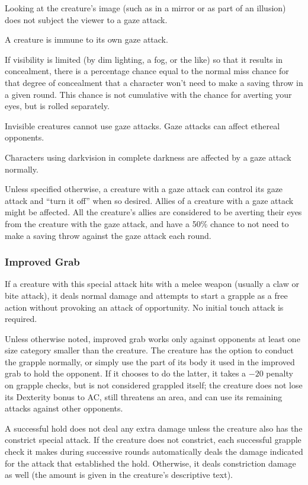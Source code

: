 Looking at the creature's image (such as in a mirror or as part of an illusion) does not subject the viewer to a gaze attack.

A creature is immune to its own gaze attack.

If visibility is limited (by dim lighting, a fog, or the like) so that it results in concealment, there is a percentage chance equal to the normal miss chance for that degree of concealment that a character won't need to make a saving throw in a given round. This chance is not cumulative with the chance for averting your eyes, but is rolled separately.

Invisible creatures cannot use gaze attacks. Gaze attacks can affect ethereal opponents.

Characters using darkvision in complete darkness are affected by a gaze attack normally.

Unless specified otherwise, a creature with a gaze attack can control its gaze attack and ``turn it off'' when so desired. Allies of a creature with a gaze attack might be affected. All the creature's allies are considered to be averting their eyes from the creature with the gaze attack, and have a 50\% chance to not need to make a saving throw against the gaze attack each round.

\subsubsection{Improved Grab}
If a creature with this special attack hits with a melee weapon (usually a claw or bite attack), it deals normal damage and attempts to start a grapple as a free action without provoking an attack of opportunity. No initial touch attack is required.

Unless otherwise noted, improved grab works only against opponents at least one size category smaller than the creature. The creature has the option to conduct the grapple normally, or simply use the part of its body it used in the improved grab to hold the opponent. If it chooses to do the latter, it takes a $-20$ penalty on grapple checks, but is not considered grappled itself; the creature does not lose its Dexterity bonus to AC, still threatens an area, and can use its remaining attacks against other opponents.

A successful hold does not deal any extra damage unless the creature also has the constrict special attack. If the creature does not constrict, each successful grapple check it makes during successive rounds automatically deals the damage indicated for the attack that established the hold. Otherwise, it deals constriction damage as well (the amount is given in the creature's descriptive text).

